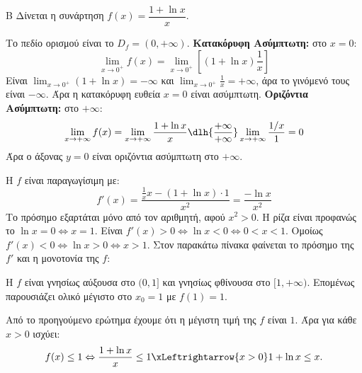 \begin{thema}{Β}
Δίνεται η συνάρτηση $f(x) = \dfrac{1+\ln x}{x}$.

\begin{erwthma}
\item Το πεδίο ορισμού είναι το $D_f = (0, +\infty)$.
\textbf{Κατακόρυφη Ασύμπτωτη:} στο $x=0$:
\[ \lim_{x\to0^+} f(x) = \lim_{x\to0^+} \left[ (1+\ln x)\frac{1}{x} \right] \]
Είναι $\lim_{x\to0^+} (1+\ln x) = -\infty$ και $\lim_{x\to0^+} \frac{1}{x} = +\infty$, άρα το γινόμενό τους είναι $-\infty$.
Άρα η κατακόρυφη ευθεία $x = 0$ είναι ασύμπτωτη.
\textbf{Οριζόντια Ασύμπτωτη:} στο $+\infty$:
\[ \lim_{x\to+\infty} f(x) = \lim_{x\to+\infty} \frac{1+\ln x}{x} \dlh{\frac{+\infty}{+\infty}} \lim_{x\to+\infty} \frac{1/x}{1} = 0 \]
Άρα ο άξονας $y=0$ είναι οριζόντια ασύμπτωτη στο $+\infty$.

\item Η $f$ είναι παραγωγίσιμη με:
\[ f'(x) = \frac{\frac{1}{x}x - (1+\ln x)\cdot 1}{x^2} = \frac{-\ln x}{x^2} \]
Το πρόσημο εξαρτάται μόνο από τον αριθμητή, αφού $x^2 > 0$. Η ρίζα είναι προφανώς το $\ln x = 0 \Leftrightarrow x = 1$.
Είναι $f'(x) > 0 \Leftrightarrow \ln x < 0 \Leftrightarrow 0 < x < 1$.
Ομοίως $f'(x) < 0 \Leftrightarrow \ln x > 0 \Leftrightarrow x > 1$.
Στον παρακάτω πίνακα φαίνεται το πρόσημο της $f'$ και η μονοτονία της $f$:
\begin{center}
\end{center}
Η $f$ είναι γνησίως αύξουσα στο $(0, 1]$ και γνησίως φθίνουσα στο $[1, +\infty)$.
Επομένως παρουσιάζει ολικό μέγιστο στο $x_0 = 1$ με $f(1) = 1$.

\item Από το προηγούμενο ερώτημα έχουμε ότι η μέγιστη τιμή της $f$ είναι $1$. Άρα για κάθε $x>0$ ισχύει:
\[ f(x) \le 1 \Leftrightarrow \frac{1+\ln x}{x} \le 1 \xLeftrightarrow{x>0} 1+\ln x \le x. \]


\end{erwthma}
\end{thema}

